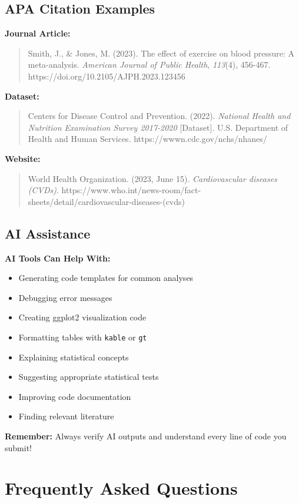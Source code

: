 \documentclass[11pt]{article}
\begin{document}
\subsection{APA Citation Examples}

\textbf{Journal Article:}
\begin{quote}
Smith, J., \& Jones, M. (2023). The effect of exercise on blood pressure: A meta-analysis. \textit{American Journal of Public Health}, \textit{113}(4), 456-467. https://doi.org/10.2105/AJPH.2023.123456
\end{quote}

\textbf{Dataset:}
\begin{quote}
Centers for Disease Control and Prevention. (2022). \textit{National Health and Nutrition Examination Survey 2017-2020} [Dataset]. U.S. Department of Health and Human Services. https://wwwn.cdc.gov/nchs/nhanes/
\end{quote}

\textbf{Website:}
\begin{quote}
World Health Organization. (2023, June 15). \textit{Cardiovascular diseases (CVDs)}. https://www.who.int/news-room/fact-sheets/detail/cardiovascular-diseases-(cvds)
\end{quote}

\subsection{AI Assistance}

\textcolor{aiblue}{\textbf{AI Tools Can Help With:}}
\begin{itemize}
\item Generating code templates for common analyses
\item Debugging error messages
\item Creating ggplot2 visualization code
\item Formatting tables with \texttt{kable} or \texttt{gt}
\item Explaining statistical concepts
\item Suggesting appropriate statistical tests
\item Improving code documentation
\item Finding relevant literature
\end{itemize}

\textcolor{aiblue}{\textbf{Remember:}} Always verify AI outputs and understand every line of code you submit!

\section{Frequently Asked Questions}
\end{document}
